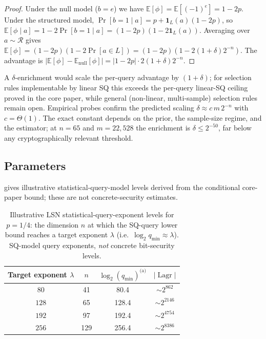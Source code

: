 \documentclass[11pt,a4paper]{article}
\theoremstyle{plain}
\theoremstyle{definition}
\newcommand{\E}{\mathbb{E}}
\DeclareMathOperator{\Lagr}{Lagr}
\begin{document}
\begin{proof}
Under the null model ($b=e$) we have $\E[\phi] = \E[(-1)^e] = 1-2p$. Under the structured model, $\Pr[b=1 \mid a] = p + \mathbf{1}_L(a)(1-2p)$, so $\E[\phi \mid a] = 1-2\Pr[b=1 \mid a] = (1-2p)(1-2\mathbf{1}_L(a))$. Averaging over $a \sim \mathcal{R}$ gives $\E[\phi] = (1-2p)(1-2\Pr[a \in L]) = (1-2p)(1-2(1+\delta)2^{-n})$. The advantage is $|\E[\phi]-\E_{\text{null}}[\phi]| = |1-2p| \cdot 2(1+\delta)2^{-n}$.
\end{proof}

A $\delta$-enrichment would scale the per-query advantage by $(1+\delta)$; for selection rules implementable by linear SQ this exceeds the per-query linear-SQ ceiling proved in the core paper, while general (non-linear, multi-sample) selection rules remain open.  Empirical probes confirm the predicted scaling $\delta \approx c\,m\,2^{-n}$ with $c=\Theta(1)$.  The exact constant depends on the prior, the sample-size regime, and the estimator; at $n=65$ and $m=22{,}528$ the enrichment is $\delta \le 2^{-50}$, far below any cryptographically relevant threshold.

\subsection{Parameters}
\label{subsec:parameters}

 gives illustrative statistical-query-model levels derived from the conditional core-paper bound; these are not concrete-security estimates.

\begin{table}[ht]
\centering
\caption{Illustrative LSN statistical-query-exponent levels for $p=1/4$: the dimension $n$ at which the SQ-query lower bound reaches a target exponent $\lambda$ (i.e.\ $\log_2 q_{\min}\approx\lambda$). SQ-model query exponents, \emph{not} concrete bit-security levels.}
\label{tab:parameters}
\begin{tabular}{@{}cccc@{}}
\hline
Target exponent $\lambda$ & $n$ & $\log_2(q_{\min})^{\text{(a)}}$ & $|\Lagr|$ \\
\hline
$80$  & 41  & 80.4  & $\sim 2^{862}$  \\
$128$ & 65  & 128.4 & $\sim 2^{2146}$ \\
$192$ & 97  & 192.4 & $\sim 2^{4754}$ \\
$256$ & 129 & 256.4 & $\sim 2^{8386}$ \\
\hline
\end{tabular}
\vspace{4pt}
\end{table}
\end{document}
